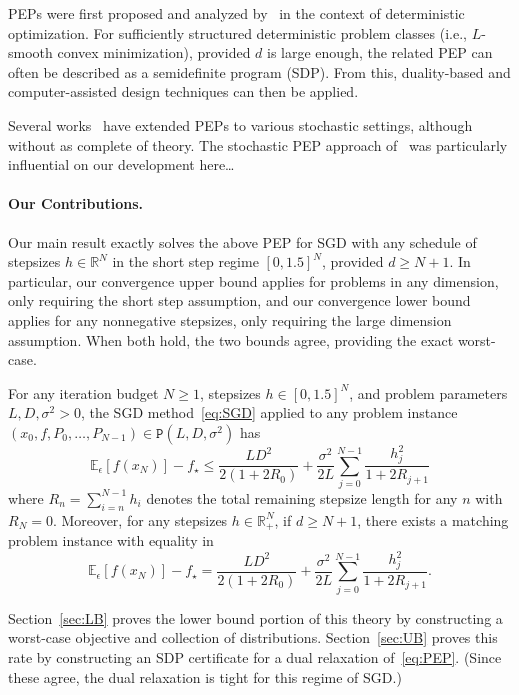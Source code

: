 \documentclass[11pt, hidelinks]{article}
\begin{document}
PEPs were first proposed and analyzed by~\cite{drori2014,taylor2017smooth,taylor2017composite} in the context of deterministic optimization. For sufficiently structured deterministic problem classes (i.e., $L$-smooth convex minimization), provided $d$ is large enough, the related PEP can often be described as a semidefinite program (SDP). From this, duality-based and computer-assisted design techniques can then be applied.

Several works~\cite{} have extended PEPs to various stochastic settings, although without as complete of theory. The stochastic PEP approach of~\cite{} was particularly influential on our development here\dots

\paragraph{Our Contributions.} 
Our main result exactly solves the above PEP for SGD with any schedule of stepsizes $h\in\mathbb{R}^N$ in the short step regime $[0,1.5]^N$, provided $d\geq N+1$. In particular, our convergence upper bound applies for problems in any dimension, only requiring the short step assumption, and our convergence lower bound applies for any nonnegative stepsizes, only requiring the large dimension assumption. When both hold, the two bounds agree, providing the exact worst-case.

\begin{theorem} \label{thm:main-rate}
    For any iteration budget $N\geq 1$, stepsizes $h\in [0,1.5]^N$, and problem parameters $L,D,\sigma^2>0$, the SGD method~\eqref{eq:SGD} applied to any problem instance $(x_0,f,P_0,\dots,P_{N-1})\in\mathtt{P}(L,D,\sigma^2)$ has
    \begin{equation*}
        \mathbb{E}_{\epsilon} \left[f(x_N)\right] - f_\star \leq \frac{LD^2}{
        2\left(1+2R_0\right)
        }
        +
        \frac{\sigma^2}{2L}
        \sum_{j=0}^{N-1}
        \frac{h_j^2}{
        1+2R_{j+1}
        }
    \end{equation*}
    where $R_n = \sum_{i=n}^{N-1} h_i$ denotes the total remaining stepsize length for any $n$ with $R_N=0$.
    Moreover, for any stepsizes $h\in \mathbb{R}_+^N$, if $d\geq N+1$, there exists a matching problem instance with equality in
    \begin{equation*}
        \mathbb{E}_{\epsilon} \left[f(x_N)\right] - f_\star = \frac{LD^2}{
        2\left(1+2R_0\right)
        }
        +
        \frac{\sigma^2}{2L}
        \sum_{j=0}^{N-1}
        \frac{h_j^2}{
        1+2R_{j+1}
        }.
    \end{equation*}
\end{theorem}
Section~\ref{sec:LB} proves the lower bound portion of this theory by constructing a worst-case objective and collection of distributions.
Section~\ref{sec:UB} proves this rate by constructing an SDP certificate for a dual relaxation of~\eqref{eq:PEP}. (Since these agree, the dual relaxation is tight for this regime of SGD.)
\end{document}
